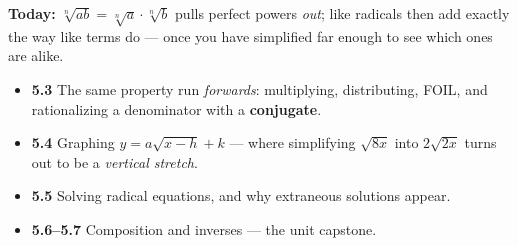 \documentclass[aspectratio=169, 11pt]{beamer}
\begin{document}
\begin{frame}[t, plain]
  \textbf{Today:} $\sqrt[n]{ab}=\sqrt[n]a\cdot\sqrt[n]b$ pulls perfect powers \emph{out}; like
  radicals then add exactly the way like terms do --- once you have simplified far enough to see
  which ones are alike.\\[8pt]
  \begin{itemize}\setlength{\itemsep}{3pt}
    \item \textbf{5.3} The same property run \emph{forwards}: multiplying, distributing, FOIL, and
          rationalizing a denominator with a \textbf{conjugate}.
    \item \textbf{5.4} Graphing $y=a\sqrt{x-h}+k$ --- where simplifying $\sqrt{8x}$ into
          $2\sqrt{2x}$ turns out to be a \emph{vertical stretch}.
    \item \textbf{5.5} Solving radical equations, and why extraneous solutions appear.
    \item \textbf{5.6--5.7} Composition and inverses --- the unit capstone.
  \end{itemize}
\end{frame}
\end{document}
